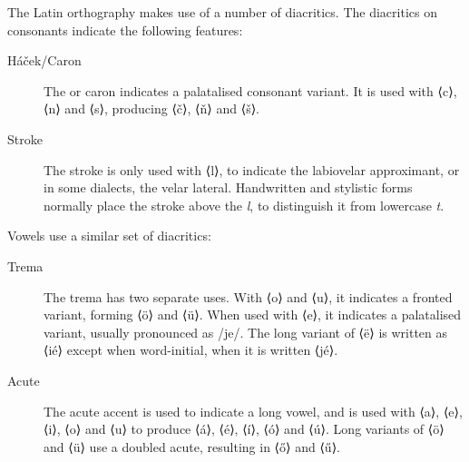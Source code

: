 \documentclass[grammar]{subfiles}
\begin{document}
  \pagebreak[2]
  The Latin orthography makes use of a number of diacritics.  The diacritics on consonants indicate the following features:

  \begin{description}
    \item[Háček/Caron] The  or caron indicates a palatalised consonant variant.  It is used with ⟨c⟩, ⟨n⟩ and ⟨s⟩, producing ⟨č⟩, ⟨ň⟩ and ⟨š⟩.
    \item[Stroke] The stroke is only used with ⟨l⟩, to indicate the labiovelar approximant, or in some dialects, the velar lateral.  Handwritten and stylistic forms normally place the stroke above the \textit l, to distinguish it from lowercase \textit t.
  \end{description}

  \pagebreak[2]
  Vowels use a similar set of diacritics:

  \begin{description}
    \item[Trema] The trema has two separate uses.  With ⟨o⟩ and ⟨u⟩, it indicates a fronted variant, forming ⟨ö⟩ and ⟨ü⟩.  When used with ⟨e⟩, it indicates a palatalised variant, usually pronounced as /je/.  The long variant of ⟨ë⟩ is written as ⟨ié⟩ except when word-initial, when it is written ⟨jé⟩. 


    \item[Acute] The acute accent is used to indicate a long vowel, and is used with ⟨a⟩, ⟨e⟩, ⟨i⟩, ⟨o⟩ and ⟨u⟩ to produce ⟨á⟩, ⟨é⟩, ⟨í⟩, ⟨ó⟩ and ⟨ú⟩.  Long variants of ⟨ö⟩ and ⟨ü⟩ use a doubled acute, resulting in ⟨ő⟩ and ⟨ű⟩. 
  \end{description}
\end{document}
